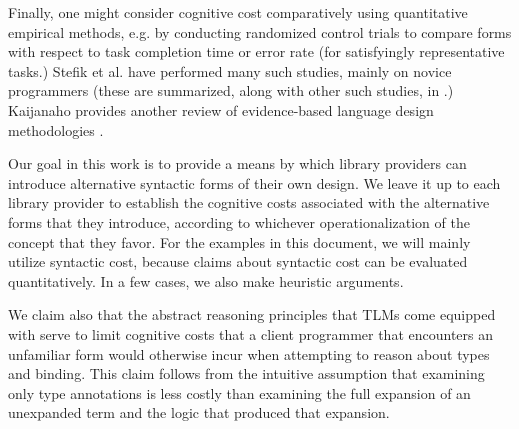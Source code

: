 Finally, one might consider cognitive cost comparatively using quantitative empirical methods, e.g. by conducting randomized control trials to compare forms with respect to task completion time or error rate (for satisfyingly representative tasks.) Stefik et al. have performed many such studies, mainly on novice programmers (these are summarized, along with other such studies, in \cite{journals/jeric/StefikS13}.) Kaijanaho provides another review of evidence-based language design methodologies \cite{kaijanaho2015evidence}.

Our goal in this work is to provide a means by which library providers can introduce alternative syntactic forms of their own design. We leave it up to each library provider to establish the cognitive costs associated with the alternative forms that they introduce, according to whichever operationalization of the concept that they favor. For the examples in this document, we will mainly utilize syntactic cost, because claims about syntactic cost can be evaluated quantitatively. In a few cases, we also make heuristic arguments. 

We claim also that the abstract reasoning principles that TLMs come equipped with serve to limit cognitive costs that a client programmer that encounters an unfamiliar form would otherwise incur when attempting to reason about types and binding. This claim follows from the intuitive assumption that examining only type annotations is less costly than examining the full expansion of an unexpanded term and the logic that produced that expansion. 




